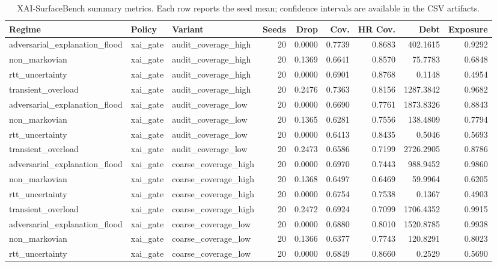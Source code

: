 \begin{table}[t]
\centering
\scriptsize
\caption{XAI-SurfaceBench summary metrics. Each row reports the seed mean; confidence intervals are available in the CSV artifacts.}
\begin{tabular}{lllrrrrrr}
\toprule
Regime & Policy & Variant & Seeds & Drop & Cov. & HR Cov. & Debt & Exposure \\
\midrule
adversarial\_explanation\_flood & xai\_gate & audit\_coverage\_high & 20 & 0.0000 & 0.7739 & 0.8683 & 402.1615 & 0.9292 \\
non\_markovian & xai\_gate & audit\_coverage\_high & 20 & 0.1369 & 0.6641 & 0.8570 & 75.7783 & 0.6848 \\
rtt\_uncertainty & xai\_gate & audit\_coverage\_high & 20 & 0.0000 & 0.6901 & 0.8768 & 0.1148 & 0.4954 \\
transient\_overload & xai\_gate & audit\_coverage\_high & 20 & 0.2476 & 0.7363 & 0.8156 & 1287.3842 & 0.9682 \\
adversarial\_explanation\_flood & xai\_gate & audit\_coverage\_low & 20 & 0.0000 & 0.6690 & 0.7761 & 1873.8326 & 0.8843 \\
non\_markovian & xai\_gate & audit\_coverage\_low & 20 & 0.1365 & 0.6281 & 0.7556 & 138.4809 & 0.7794 \\
rtt\_uncertainty & xai\_gate & audit\_coverage\_low & 20 & 0.0000 & 0.6413 & 0.8435 & 0.5046 & 0.5693 \\
transient\_overload & xai\_gate & audit\_coverage\_low & 20 & 0.2473 & 0.6586 & 0.7199 & 2726.2905 & 0.8786 \\
adversarial\_explanation\_flood & xai\_gate & coarse\_coverage\_high & 20 & 0.0000 & 0.6970 & 0.7443 & 988.9452 & 0.9860 \\
non\_markovian & xai\_gate & coarse\_coverage\_high & 20 & 0.1368 & 0.6497 & 0.6469 & 59.9964 & 0.6205 \\
rtt\_uncertainty & xai\_gate & coarse\_coverage\_high & 20 & 0.0000 & 0.6754 & 0.7538 & 0.1367 & 0.4903 \\
transient\_overload & xai\_gate & coarse\_coverage\_high & 20 & 0.2472 & 0.6924 & 0.7099 & 1706.4352 & 0.9915 \\
adversarial\_explanation\_flood & xai\_gate & coarse\_coverage\_low & 20 & 0.0000 & 0.6880 & 0.8010 & 1520.8785 & 0.9938 \\
non\_markovian & xai\_gate & coarse\_coverage\_low & 20 & 0.1366 & 0.6377 & 0.7743 & 120.8291 & 0.8023 \\
rtt\_uncertainty & xai\_gate & coarse\_coverage\_low & 20 & 0.0000 & 0.6849 & 0.8660 & 0.2529 & 0.5690 \\

\end{tabular}
\end{table}
